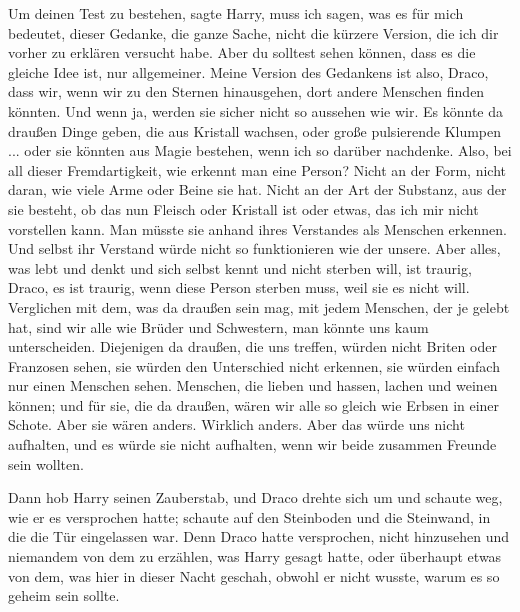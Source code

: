 \glqq{}Um deinen Test zu bestehen\grqq{}, sagte Harry, \glqq{}muss ich sagen, was
es für mich bedeutet, dieser Gedanke, die ganze Sache, nicht die kürzere
Version, die ich dir vorher zu erklären versucht habe. Aber du solltest sehen
können, dass es die gleiche Idee ist, nur allgemeiner. Meine Version des
Gedankens ist also, Draco, dass wir, wenn wir zu den Sternen hinausgehen, dort
andere Menschen finden könnten. Und wenn ja, werden sie sicher nicht so aussehen
wie wir. Es könnte da draußen Dinge geben, die aus Kristall wachsen, oder große
pulsierende Klumpen ... oder sie könnten aus Magie bestehen, wenn ich so darüber
nachdenke. Also, bei all dieser Fremdartigkeit, wie erkennt man eine Person?
Nicht an der Form, nicht daran, wie viele Arme oder Beine sie hat. Nicht an der
Art der Substanz, aus der sie besteht, ob das nun Fleisch oder Kristall ist oder
etwas, das ich mir nicht vorstellen kann. Man müsste sie anhand ihres Verstandes
als Menschen erkennen. Und selbst ihr Verstand würde nicht so funktionieren wie
der unsere. Aber alles, was lebt und denkt und sich selbst kennt und nicht
sterben will, ist traurig, Draco, es ist traurig, wenn diese Person sterben
muss, weil sie es nicht will. Verglichen mit dem, was da draußen sein mag, mit
jedem Menschen, der je gelebt hat, sind wir alle wie Brüder und Schwestern, man
könnte uns kaum unterscheiden. Diejenigen da draußen, die uns treffen, würden
nicht Briten oder Franzosen sehen, sie würden den Unterschied nicht erkennen,
sie würden einfach nur einen Menschen sehen. Menschen, die lieben und hassen,
lachen und weinen können; und für sie, die da draußen, wären wir alle so gleich
wie Erbsen in einer Schote. Aber sie wären anders. Wirklich anders. Aber das
würde uns nicht aufhalten, und es würde sie nicht aufhalten, wenn wir beide
zusammen Freunde sein wollten.\grqq{}

Dann hob Harry seinen Zauberstab, und Draco drehte sich um und schaute weg, wie
er es versprochen hatte; schaute auf den Steinboden und die Steinwand, in die
die Tür eingelassen war. Denn Draco hatte versprochen, nicht hinzusehen und
niemandem von dem zu erzählen, was Harry gesagt hatte, oder überhaupt etwas von
dem, was hier in dieser Nacht geschah, obwohl er nicht wusste, warum es so
geheim sein sollte.

